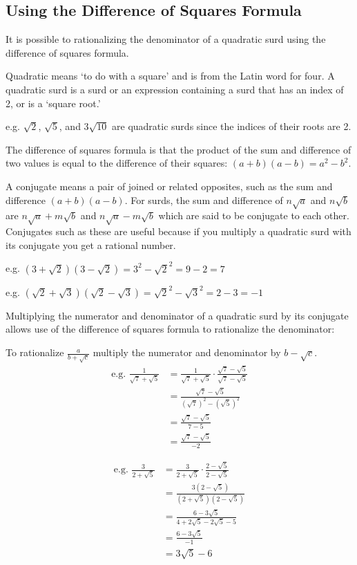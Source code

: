 \documentclass{article}
\begin{document}
\newpage

\subsection{Using the Difference of Squares Formula}

It is possible to rationalizing the denominator of a quadratic surd using the difference of squares formula.

Quadratic means ‘to do with a square’ and is from the Latin word for four. A quadratic surd is a surd or an expression containing a surd that has an index of 2, or is a ‘square root.’

e.g. $\sqrt{2}$, $\sqrt{5}$, and $3\sqrt{10}$ are quadratic surds since the indices of their roots are 2.

The difference of squares formula is that the product of the sum and difference of two values is equal to the difference of their squares: $(a+b)(a-b)=a^2-b^2$.

A conjugate means a pair of joined or related opposites, such as the sum and difference $(a+b)(a-b)$. For surds, the sum and difference of $n\sqrt{a}$ and $n\sqrt{b}$ are $n\sqrt{a}+m\sqrt{b}$ and $n\sqrt{a}-m\sqrt{b}$ which are said to be conjugate to each other. Conjugates such as these are useful because if you multiply a quadratic surd with its conjugate you get a rational number.

e.g. $(3+\sqrt{2})(3-\sqrt{2})=3^2-{\sqrt{2}}^2=9-2=7$

e.g. $(\sqrt{2}+\sqrt{3})(\sqrt{2}-\sqrt{3})={\sqrt{2}}^2-{\sqrt{3} }^2=2-3=-1$

Multiplying the numerator and denominator of a quadratic surd by its conjugate allows use of the difference of squares formula to rationalize the denominator:

To rationalize $\frac{a}{b+\sqrt{c}}$ multiply the numerator and denominator by $b-\sqrt{c}$.
\begin{align*}
\text{e.g. }
\frac{1}{\sqrt{7}+\sqrt{5}}
&=\frac{1}{\sqrt{7}+\sqrt{5}}
\cdot\frac{\sqrt{7}-\sqrt{5}}{\sqrt{7}-\sqrt{5}}\\
&=\frac{\sqrt{7}-\sqrt{5}}{(\sqrt{7})^2-(\sqrt{5})^2}\\
&=\frac{\sqrt{7}-\sqrt{5}}{7-5}\\
&=\frac{\sqrt{7}-\sqrt{5}}{-2}
\end{align*}

\begin{align*}
\text{e.g. }
\frac{3}{2+\sqrt{5}}
&=\frac{3}{2+\sqrt5}\cdot\frac{2-\sqrt{5}}{2-\sqrt{5}}\\
&=\frac{3(2-\sqrt{5})}{(2+\sqrt{5})(2-\sqrt{5})}\\
&=\frac{6-3\sqrt{5}}{4+2\sqrt{5}-2\sqrt{5}-5}\\
&=\frac{6-3\sqrt{5}}{-1}\\
&=3\sqrt{5}-6
\end{align*}
\end{document}

